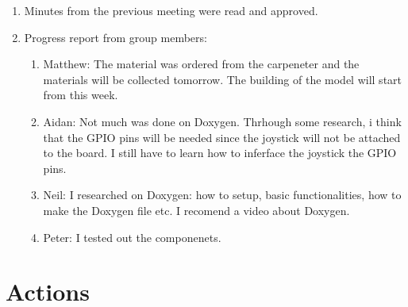 \documentclass[11pt,a4paper]{article}
\begin{document}
\begin{enumerate}


\item Minutes from the previous meeting were read and approved.

\item Progress report from group members:
   \begin{enumerate}
   \item Matthew: The material was ordered from the carpeneter and the materials will be collected tomorrow. The building of the model will start from this week. 
	
   \item Aidan: Not much was done on Doxygen. Thrhough some research, i think that the GPIO pins will be needed since the joystick will not be attached to the board. I still have to learn how to inferface the joystick the GPIO pins. 

   \item Neil: I researched on Doxygen: how to setup, basic functionalities, how to make the Doxygen file etc. I recomend a video about Doxygen.

   \item Peter: I tested out the componenets. 


   \end{enumerate}



\end{enumerate}

\section*{Actions}
\end{document}
